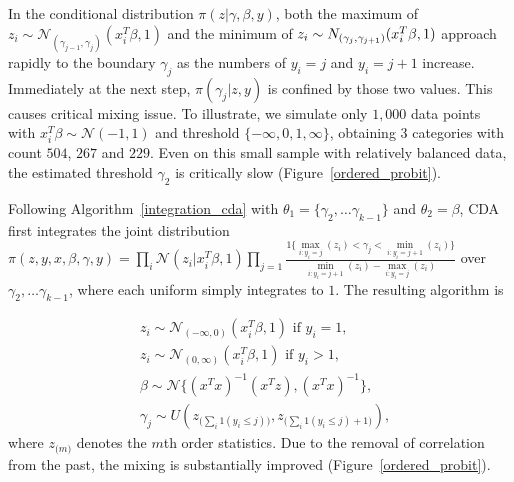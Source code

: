 \documentclass[10pt]{article}
\begin{document}
In the conditional distribution $\pi( z|\gamma,\beta,y) $, both the maximum of $z_i \sim \mathcal N_{(\gamma_{j-1}, \gamma_{j})}(x^T_i\beta,1)$ and the minimum of $z_i \sim \mathcal \mathcal{N}_{(\gamma_{j}, \gamma_{j+1})}(x^T_i\beta,1)$ approach rapidly to the boundary $\gamma_j$ as the numbers of $y_i=j$ and $y_i=j+1$ increase. Immediately at the next step,  $\pi( \gamma_j| z,y) $ is confined by those two values. This causes critical mixing issue. To illustrate, we simulate only $1,000$ data points with $x_i^T\beta \sim \mathcal{N}(-1,1)$ and threshold $\{-\infty, 0, 1, \infty\}$, obtaining 3 categories with count $504$, $267$ and $229$. Even on this small sample with relatively balanced data, the estimated threshold $\gamma_2$ is critically slow (Figure~\ref{ordered_probit}).

Following Algorithm~\ref{integration_cda} with $\theta_1=\{ \gamma_2,\ldots \gamma_{k-1}\}$ and $\theta_2=\beta$, CDA first integrates the joint distribution $\pi(z,y,x,\beta,\gamma,y)= \prod_i  {\mathcal N} (z_i |x^T_i\beta,1)   \prod_{j=1} \frac{1 \{ \underset{i:y_i=j}{\max}(z_i) < \gamma_j< \underset{i:y_i=j+1}{\min} (z_i) \}}{\underset{i:y_i=j+1}{\min} (z_i) -\underset{i:y_i=j}{\max}(z_i) }$ over $\gamma_2,\ldots \gamma_{k-1}$, where each uniform simply integrates to $1$. The resulting algorithm is 

\begin{equation}
	\begin{aligned}
	&	z_i \sim  {\mathcal N}_{(-\infty,0)} (x^T_i\beta,1) \text{ if $y_i=1$},\\
	&	z_i \sim {\mathcal N}_{(0,\infty)} (x^T_i\beta,1) \text{ if $y_i>1$},\\
	&	\beta \sim \mathcal{N} \{   (x^Tx)^{-1}(x^Tz),(x^Tx)^{-1}  \} ,\\
	& \gamma_j\sim U(  z_{\big(\sum_i 1(y_i \le j) \big)}, z_{\big(\sum_i 1(y_i \le j)+1 \big)}), 
	\end{aligned}
\end{equation}
where $z_{\big(m\big)}$ denotes the $m$th order statistics. Due to the removal of correlation from the past, the mixing is substantially improved (Figure~\ref{ordered_probit}).
\end{document}

